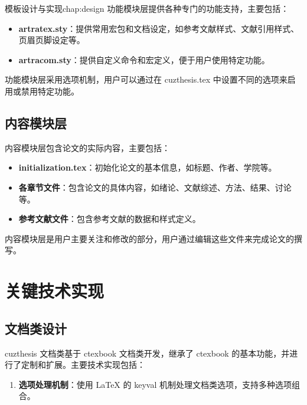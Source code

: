 \begin{cuzchapter}{模板设计与实现}{chap:design}
    功能模块层提供各种专门的功能支持，主要包括：
    
    \begin{itemize}
        \item \textbf{artratex.sty}：提供常用宏包和文档设定，如参考文献样式、文献引用样式、页眉页脚设定等。
        
        \item \textbf{artracom.sty}：提供自定义命令和宏定义，便于用户使用特定功能。
    \end{itemize}
    
    功能模块层采用选项机制，用户可以通过在 cuzthesis.tex 中设置不同的选项来启用或禁用特定功能。
    
    \subsection{内容模块层}
    
    内容模块层包含论文的实际内容，主要包括：
    
    \begin{itemize}
        \item \textbf{initialization.tex}：初始化论文的基本信息，如标题、作者、学院等。
        
        \item \textbf{各章节文件}：包含论文的具体内容，如绪论、文献综述、方法、结果、讨论等。
        
        \item \textbf{参考文献文件}：包含参考文献的数据和样式定义。
    \end{itemize}
    
    内容模块层是用户主要关注和修改的部分，用户通过编辑这些文件来完成论文的撰写。
    
    \section{关键技术实现}\label{sec:key-technologies}
    
    \subsection{文档类设计}
    
    cuzthesis 文档类基于 ctexbook 文档类开发，继承了 ctexbook 的基本功能，并进行了定制和扩展。主要技术实现包括：
    
    \begin{enumerate}
        \item \textbf{选项处理机制}：使用 LaTeX 的 keyval 机制处理文档类选项，支持多种选项组合。
        

\end{enumerate}
\end{cuzchapter}
